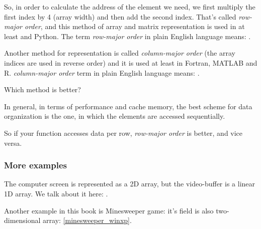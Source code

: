 
So, in order to calculate the address of the element we need, we first multiply the first index by
4 (array width) and then add the second index.
That's called \emph{row-major order}, 
and this method of array and matrix representation is used in at least \CCpp and Python. 
The term \emph{row-major order} 
in plain English language means: .

Another method for representation is called \emph{column-major order} (the array indices are used in reverse order) 
and it is used at least in Fortran, MATLAB and R. 
\emph{column-major order} term in plain English language means: .

Which method is better?

In general, in terms of performance and cache memory, 
the best scheme for data organization is the one,
in which the elements are accessed sequentially.

So if your function accesses data per row, \emph{row-major order} is better, and vice versa.





\subsubsection{More examples}

The computer screen is represented as a 2D array, but the video-buffer is a linear 1D array. 
We talk about it here: .

Another example in this book is Minesweeper game: it's field is also two-dimensional array: \ref{minesweeper_winxp}.

